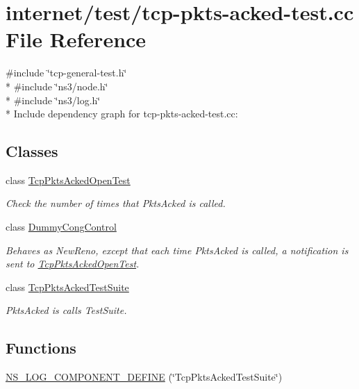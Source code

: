 \hypertarget{tcp-pkts-acked-test_8cc}{}\section{internet/test/tcp-\/pkts-\/acked-\/test.cc File Reference}
\label{tcp-pkts-acked-test_8cc}
{\ttfamily \#include \char`\"{}tcp-\/general-\/test.\+h\char`\"{}}\\*
{\ttfamily \#include \char`\"{}ns3/node.\+h\char`\"{}}\\*
{\ttfamily \#include \char`\"{}ns3/log.\+h\char`\"{}}\\*
Include dependency graph for tcp-\/pkts-\/acked-\/test.cc\+:
\subsection*{Classes}
\begin{DoxyCompactItemize}
\item 
class \hyperlink{classTcpPktsAckedOpenTest}{Tcp\+Pkts\+Acked\+Open\+Test}
\begin{DoxyCompactList}\small\item\em Check the number of times that Pkts\+Acked is called. \end{DoxyCompactList}\item 
class \hyperlink{classDummyCongControl}{Dummy\+Cong\+Control}
\begin{DoxyCompactList}\small\item\em Behaves as New\+Reno, except that each time Pkts\+Acked is called, a notification is sent to \hyperlink{classTcpPktsAckedOpenTest}{Tcp\+Pkts\+Acked\+Open\+Test}. \end{DoxyCompactList}\item 
class \hyperlink{classTcpPktsAckedTestSuite}{Tcp\+Pkts\+Acked\+Test\+Suite}
\begin{DoxyCompactList}\small\item\em Pkts\+Acked is calls Test\+Suite. \end{DoxyCompactList}\end{DoxyCompactItemize}
\subsection*{Functions}
\begin{DoxyCompactItemize}
\item 
\hyperlink{tcp-pkts-acked-test_8cc_a56c689619ed891f5461ac2f7ae9ea2af}{N\+S\+\_\+\+L\+O\+G\+\_\+\+C\+O\+M\+P\+O\+N\+E\+N\+T\+\_\+\+D\+E\+F\+I\+NE} (\char`\"{}Tcp\+Pkts\+Acked\+Test\+Suite\char`\"{})
\end{DoxyCompactItemize}
